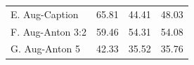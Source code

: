 \documentclass[aspectratio=1610]{beamer} %
\begin{document}
\begin{frame}
\begin{table}[htbp]
{\begin{tabular}{|l|rrr|}
\hdashline
E. Aug-Caption             & 65.81                                                & 44.41                                                     & 48.03                                                      \\
F. Aug-Anton 3:2 & 59.46                                                    & 54.31                                                 & 54.08                                                     \\
G. Aug-Anton 5  & 42.33                                                    & 35.52                                                     & 35.76                                                      \\
\hline
\end{tabular}
}
\label{fig:results}
\end{table}
\end{frame}


\end{document}
